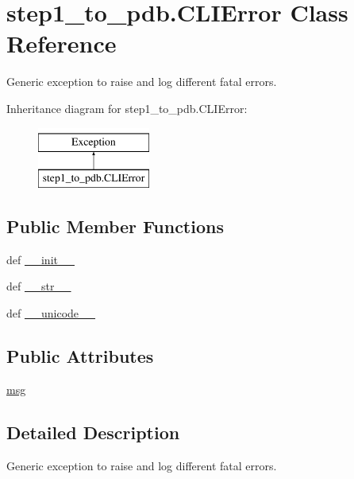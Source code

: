 \hypertarget{classstep1__to__pdb_1_1_c_l_i_error}{\section{step1\-\_\-to\-\_\-pdb.\-C\-L\-I\-Error Class Reference}
\label{classstep1__to__pdb_1_1_c_l_i_error}
}


Generic exception to raise and log different fatal errors.  


Inheritance diagram for step1\-\_\-to\-\_\-pdb.\-C\-L\-I\-Error\-:\begin{figure}[H]
\begin{center}
\leavevmode
\includegraphics[height=2.000000cm]{classstep1__to__pdb_1_1_c_l_i_error}
\end{center}
\end{figure}
\subsection*{Public Member Functions}
\begin{DoxyCompactItemize}
\item 
def \hyperlink{classstep1__to__pdb_1_1_c_l_i_error_af7ef908bc07f68e5f79a620dde83dba0}{\-\_\-\-\_\-init\-\_\-\-\_\-}
\item 
def \hyperlink{classstep1__to__pdb_1_1_c_l_i_error_a75c25a11ea5c4ab13bc7970fc85e8487}{\-\_\-\-\_\-str\-\_\-\-\_\-}
\item 
def \hyperlink{classstep1__to__pdb_1_1_c_l_i_error_a5227949d447b7d28c3fec0983891c004}{\-\_\-\-\_\-unicode\-\_\-\-\_\-}
\end{DoxyCompactItemize}
\subsection*{Public Attributes}
\begin{DoxyCompactItemize}
\item 
\hyperlink{classstep1__to__pdb_1_1_c_l_i_error_adc73a367f4c49d59a08eb66d2d95dfc5}{msg}
\end{DoxyCompactItemize}


\subsection{Detailed Description}
Generic exception to raise and log different fatal errors. 



